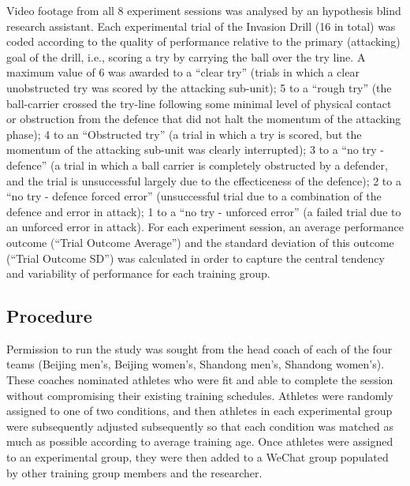 \documentclass[english]{article}\usepackage[]{graphicx}\usepackage[]{color}
\begin{document}
Video footage from all 8 experiment sessions was analysed by an hypothesis blind research assistant.  Each experimental trial of the Invasion Drill (16 in total) was coded according to the quality of performance relative to the primary (attacking) goal of the drill, i.e., scoring a try by carrying the ball over the try line.  A maximum value of 6 was awarded to a ``clear try'' (trials in which a clear unobstructed try was scored by the attacking sub-unit); 5 to a ``rough try'' (the ball-carrier crossed the try-line following some minimal level of physical contact or obstruction from the defence that did not halt the momentum of the attacking phase); 4 to an ``Obstructed try'' (a trial in which a try is scored, but the momentum of the attacking sub-unit was clearly interrupted); 3 to a ``no try - defence''  (a trial in which a ball carrier is completely obstructed by a defender, and the trial is unsuccessful largely due to the effecticeness of the defence); 2 to a ``no try - defence forced error'' (unsuccessful trial due to a combination of the defence and error in attack); 1 to a ``no try - unforced error'' (a failed trial due to an unforced error in attack).
For each experiment session, an average performance outcome (``Trial Outcome Average'') and the standard deviation of this outcome (``Trial Outcome SD'') was calculated in order to capture the central tendency and variability of performance for each training group.

\subsection{Procedure}
Permission to run the study was sought from the head coach of each of the four teams (Beijing men's, Beijing women's, Shandong men's, Shandong women's).  These coaches nominated athletes who were fit and able to complete the session without compromising their existing training schedules.  Athletes were randomly assigned to one of two conditions, and then athletes in each experimental group were subsequently adjusted subsequently so that each condition was matched as much as possible according to average training age. Once athletes were assigned to an experimental group, they were then added to a WeChat group populated by other training group members and the researcher.
\end{document}
